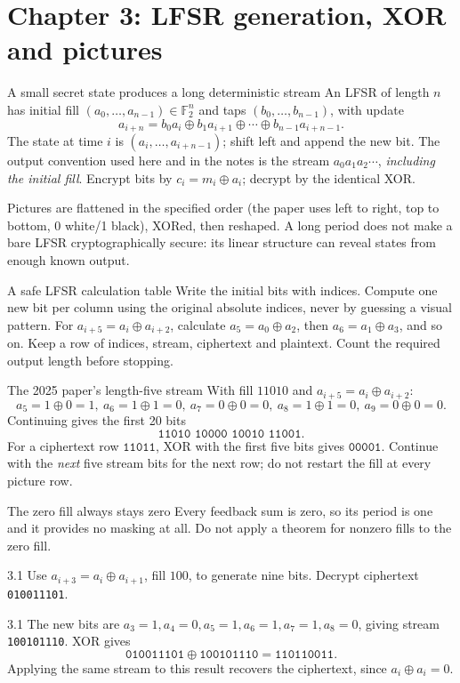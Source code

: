 \documentclass[11pt,a4paper]{article}
\newcommand{\F}{\mathbb F}\newcommand{\Z}{\mathbb Z}
\begin{document}
\section{Chapter 3: LFSR generation, XOR and pictures}
\begin{concept}{A small secret state produces a long deterministic stream}
An LFSR of length \(n\) has initial fill \((a_0,\ldots,a_{n-1})\in\F_2^n\) and taps \((b_0,\ldots,b_{n-1})\), with update
\[a_{i+n}=b_0a_i\oplus b_1a_{i+1}\oplus\cdots\oplus b_{n-1}a_{i+n-1}.\]
The state at time \(i\) is \((a_i,\ldots,a_{i+n-1})\); shift left and append the new bit. The output convention used here and in the notes is the stream \(a_0a_1a_2\cdots\), \emph{including the initial fill}. Encrypt bits by \(c_i=m_i\oplus a_i\); decrypt by the identical XOR.

Pictures are flattened in the specified order (the paper uses left to right, top to bottom, 0 white/1 black), XORed, then reshaped. A long period does not make a bare LFSR cryptographically secure: its linear structure can reveal states from enough known output.
\end{concept}
\begin{method}{A safe LFSR calculation table}
Write the initial bits with indices. Compute one new bit per column using the original absolute indices, never by guessing a visual pattern. For \(a_{i+5}=a_i\oplus a_{i+2}\), calculate \(a_5=a_0\oplus a_2\), then \(a_6=a_1\oplus a_3\), and so on. Keep a row of indices, stream, ciphertext and plaintext. Count the required output length before stopping.
\end{method}
\begin{example}{The 2025 paper's length-five stream}
With fill \(11010\) and \(a_{i+5}=a_i\oplus a_{i+2}\):
\[a_5=1\oplus0=1,\ a_6=1\oplus1=0,\ a_7=0\oplus0=0,\ a_8=1\oplus1=0,\ a_9=0\oplus0=0.\]
Continuing gives the first 20 bits
\[\texttt{11010 10000 10010 11001}.\]
For a ciphertext row \(\texttt{11011}\), XOR with the first five bits gives \(\texttt{00001}\). Continue with the \emph{next} five stream bits for the next row; do not restart the fill at every picture row.
\end{example}
\begin{tip}{The zero fill always stays zero}
Every feedback sum is zero, so its period is one and it provides no masking at all. Do not apply a theorem for nonzero fills to the zero fill.
\end{tip}
\begin{question}{3.1}
Use \(a_{i+3}=a_i\oplus a_{i+1}\), fill \(100\), to generate nine bits. Decrypt ciphertext \texttt{010011101}.
\end{question}
\begin{answer}{3.1}
The new bits are \(a_3=1,a_4=0,a_5=1,a_6=1,a_7=1,a_8=0\), giving stream \texttt{100101110}. XOR gives
\[\texttt{010011101}\oplus\texttt{100101110}=\texttt{110110011}.\]
Applying the same stream to this result recovers the ciphertext, since \(a_i\oplus a_i=0\).
\end{answer}
\end{document}

